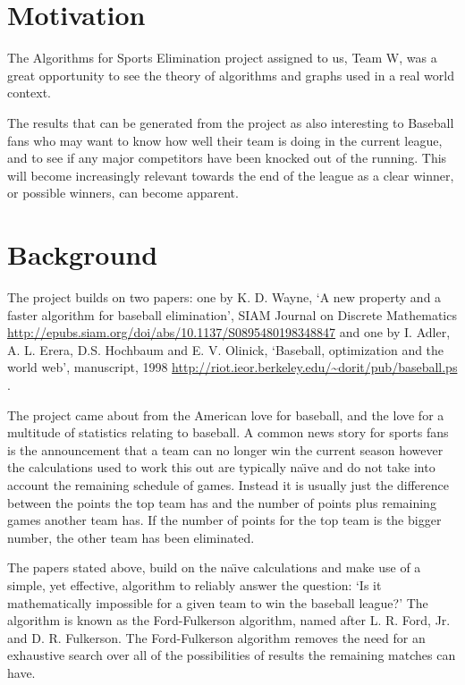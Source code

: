 \section{Motivation}

The Algorithms for Sports Elimination project assigned to us, Team W, was a
great opportunity to see the theory of algorithms and graphs used in a real
world context.

The results that can be generated from the project as also interesting to
Baseball fans who may want to know how well their team is doing in the current
league, and to see if any major competitors have been knocked out of the
running. This will become increasingly relevant towards the end of the league
as a clear winner, or possible winners, can become apparent.

\section{Background}

The project builds on two papers: one by K. D. Wayne, `A new property and a
faster algorithm for baseball elimination', SIAM Journal on Discrete
Mathematics \url{http://epubs.siam.org/doi/abs/10.1137/S0895480198348847}
\cite{Wayne} and one by I. Adler, A. L. Erera, D.S. Hochbaum and E. V. Olinick,
`Baseball, optimization and the world web', manuscript, 1998
\url{http://riot.ieor.berkeley.edu/~dorit/pub/baseball.ps} \cite{Adler}.

The project came about from the American love for baseball, and the love for
a multitude of statistics relating to baseball. A common news story for sports
fans is the announcement that a team can no longer win the current season
however the calculations used to work this out are typically na\"{\i}ve and
do not take into account the remaining schedule of games. Instead it is
usually just the difference between the points the top team has and the number
of points plus remaining games another team has. If the number of points
for the top team is the bigger number, the other team has been eliminated.

The papers stated above, build on the na\"{\i}ve calculations and make use of a
simple, yet effective, algorithm to reliably answer the question:
`Is it mathematically impossible for a given team to win the baseball league?'
The algorithm is known as the Ford-Fulkerson algorithm, named after L. R. Ford,
Jr. and D. R. Fulkerson. The Ford-Fulkerson algorithm removes the need for an
exhaustive search over all of the possibilities of results the remaining
matches can have.

